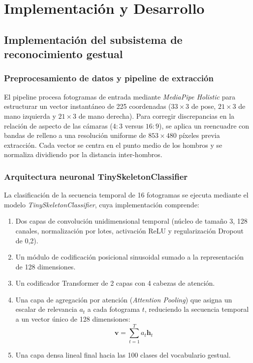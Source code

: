 \chapter{Implementación y Desarrollo}
\label{cap:implementacion}

\section{Implementación del subsistema de reconocimiento gestual}

\subsection{Preprocesamiento de datos y pipeline de extracción}
El pipeline procesa fotogramas de entrada mediante \textit{MediaPipe Holistic} para estructurar un vector instantáneo de 225 coordenadas ($33 \times 3$ de pose, $21 \times 3$ de mano izquierda y $21 \times 3$ de mano derecha). Para corregir discrepancias en la relación de aspecto de las cámaras ($4:3$ versus $16:9$), se aplica un reencuadre con bandas de relleno a una resolución uniforme de $853 \times 480$ píxeles previa extracción. Cada vector se centra en el punto medio de los hombros y se normaliza dividiendo por la distancia inter-hombros.

\subsection{Arquitectura neuronal TinySkeletonClassifier}
La clasificación de la secuencia temporal de 16 fotogramas se ejecuta mediante el modelo \textit{TinySkeletonClassifier}, cuya implementación comprende:
\begin{enumerate}
    \item Dos capas de convolución unidimensional temporal (núcleo de tamaño 3, 128 canales, normalización por lotes, activación ReLU y regularización Dropout de 0,2).
    \item Un módulo de codificación posicional sinusoidal sumado a la representación de 128 dimensiones.
    \item Un codificador Transformer de 2 capas con 4 cabezas de atención.
    \item Una capa de agregación por atención (\textit{Attention Pooling}) que asigna un escalar de relevancia $a_t$ a cada fotograma $t$, reduciendo la secuencia temporal a un vector único de 128 dimensiones:
    \begin{equation}
    \mathbf{v} = \sum_{t=1}^{T} a_t \mathbf{h}_t
    \label{eq:attention_pooling}
    \end{equation}
    \item Una capa densa lineal final hacia las 100 clases del vocabulario gestual.
\end{enumerate}

